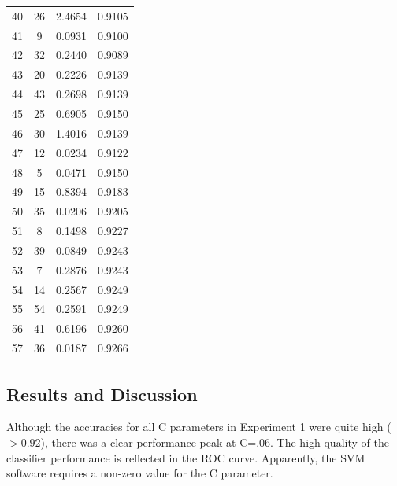 \documentclass[12pt]{article}
\begin{document}
\begin{longtable}[!htbp]{lccc}
40 & 26 & 2.4654 & 0.9105\\
41 & 9 & 0.0931 & 0.9100\\
42 & 32 & 0.2440 & 0.9089\\
43 & 20 & 0.2226 & 0.9139\\
44 & 43 & 0.2698 & 0.9139\\
45 & 25 & 0.6905 & 0.9150\\
46 & 30 & 1.4016 & 0.9139\\
47 & 12 & 0.0234 & 0.9122\\
48 & 5 & 0.0471 & 0.9150\\
49 & 15 & 0.8394 & 0.9183\\
50 & 35 & 0.0206 & 0.9205\\
51 & 8 & 0.1498 & 0.9227\\
52 & 39 & 0.0849 & 0.9243\\
53 & 7 & 0.2876 & 0.9243\\
54 & 14 & 0.2567 & 0.9249\\
55 & 54 & 0.2591 & 0.9249\\
56 & 41 & 0.6196 & 0.9260\\
57 & 36 & 0.0187 & 0.9266\\
\end{longtable}


\subsection{Results and Discussion}
Although the accuracies for all C parameters in Experiment 1 were quite high ($>$0.92), there was a clear performance peak at C=.06. The high quality of the classifier performance is reflected in the ROC curve. Apparently, the SVM software requires a non-zero value for the C parameter.\\
\end{document}
